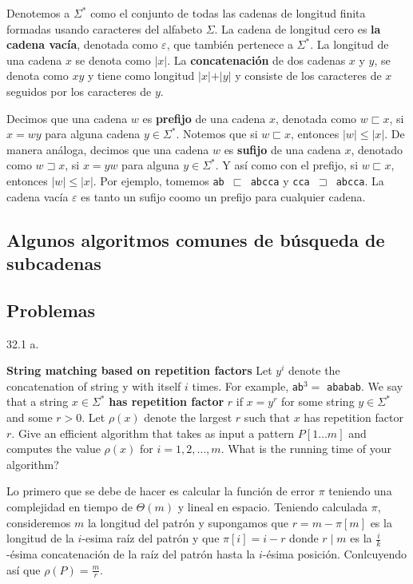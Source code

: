 Denotemos a $\Sigma^*$ como el conjunto de todas las cadenas de longitud finita formadas usando
caracteres del alfabeto $\Sigma$. La cadena de longitud cero es \textbf{la cadena vacía}, denotada
como $\varepsilon$, que también pertenece a $\Sigma^*$. La longitud de una cadena $x$ se denota
como $\vert x \vert$. La \textbf{concatenación} de dos cadenas $x$ y $y$, se denota como $xy$ y
tiene como longitud $\vert x \vert + \vert y \vert$ y consiste de los caracteres de $x$ seguidos
por los caracteres de $y$.

Decimos que una cadena $w$ es \textbf{prefijo} de una cadena $x$, denotada como $w \sqsubset x$, si
$x = wy$ para alguna cadena $y \in \Sigma^*$. Notemos que si $w \sqsubset x$, entonces
$\vert w \vert \leq \vert x \vert$. De manera análoga, decimos que una cadena $w$ es \textbf{sufijo}
de una cadena $x$, denotado como $w \sqsupset x$, si $x = yw$ para alguna $y \in \Sigma^*$. Y así
como con el prefijo, si $w \sqsubset x$, entonces $\vert w \vert \leq \vert x \vert$.
Por ejemplo, tomemos \texttt{ab $\sqsubset$ abcca} y \texttt{cca $\sqsupset$ abcca}. La cadena
vacía $\varepsilon$ es tanto un sufijo coomo un prefijo para cualquier cadena.

\subsection{Algunos algoritmos comunes de búsqueda de subcadenas}

\subsection{Problemas} %

\begin{tcolorbox}
  \hypertarget{repetition_factor}{32.1 a.}
  \textbf{String matching based on repetition factors}
  Let $y^i$ denote the concatenation of string y with itself $i$ times. For example,
  \texttt{ab}$^3 =$ \texttt{ababab}. We say that a string $x \in \Sigma^*$
  \textbf{has repetition factor} $r$ if $x = y^r$ for some string $y \in \Sigma^*$ and some $r > 0$.
  Let $\rho(x)$ denote the largest $r$ such that $x$ has repetition factor $r$.
  Give an efficient algorithm that takes as input a pattern $P[1 \ldots m]$ and computes the value
  $\rho(x)$ for $i = 1,2,\ldots,m$. What is the running time of your algorithm?
  \end{tcolorbox}
  
  Lo primero que se debe de hacer es calcular la función de error $\pi$ teniendo una complejidad en
  tiempo de $\Theta(m)$ y lineal en espacio. Teniendo calculada $\pi$, consideremos $m$ la longitud
  del patrón y supongamos que $r = m - \pi[m]$ es la longitud de la $i$-esima raíz del patrón y que
  $\pi[i] = i - r$ donde $r \mid m$ es la $\frac{i}{k}$-ésima concatenación de la raíz del patrón
  hasta la $i$-ésima posición. Conlcuyendo así que $\rho(P) = \frac{m}{r}$.
  

